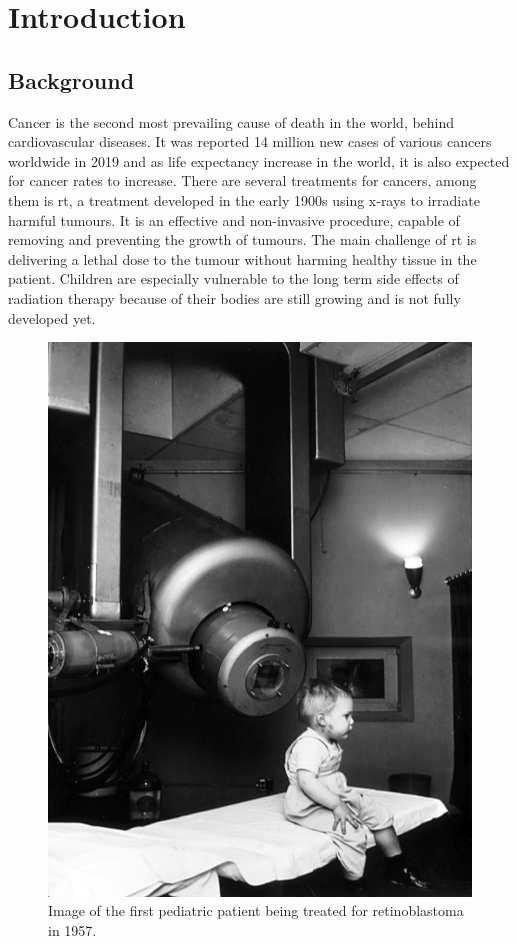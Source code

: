 \documentclass[main.tex]{subfiles}
\begin{document}
\section{Introduction}

\subsection{Background}

Cancer is the second most prevailing cause of death in the world, behind cardiovascular diseases. It was reported 14 million new cases of various cancers worldwide in 2019 \cite{porcine_2021} and as life expectancy increase in the world, it is also expected for cancer rates to increase. There are several treatments for cancers, among them is \gls{rt}, a treatment developed in the early 1900s using x-rays to irradiate harmful tumours. It is an effective and non-invasive procedure, capable of removing and preventing the growth of tumours. The main challenge of \gls{rt} is delivering a lethal dose to the tumour without harming healthy tissue in the patient. Children are especially vulnerable to the long term side effects of radiation therapy because of their bodies are still growing and is not fully developed yet.

\begin{figure}[!ht]
    \centering
    \includegraphics[scale = 0.4]{images/rt_intro.jpg}
    \caption{Image of the first pediatric patient being treated for retinoblastoma in 1957.\cite{rt_intro}}
    \label{fig: rt_intro}
\end{figure}
\FloatBarrier
\end{document}

